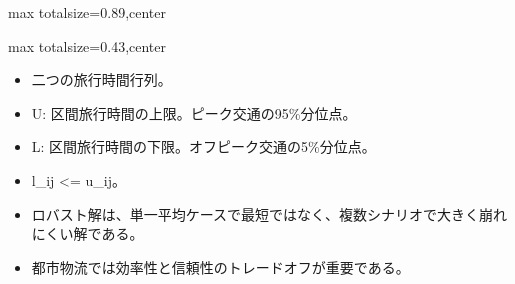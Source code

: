 \begin{minipage}[t]{0.58\textwidth}
\begin{adjustbox}{max totalsize={\textwidth}{0.89\textheight},center}
\begin{minipage}{\textwidth}
\end{minipage}
\end{adjustbox}
\end{minipage}


\clearpage
{}
\begin{minipage}[t]{0.405\textwidth}
\begin{adjustbox}{max totalsize={\textwidth}{0.43\textheight},center}
\begin{minipage}{\textwidth}\scriptsize
{}\begin{itemize}
\item 二つの旅行時間行列。
\item U: 区間旅行時間の上限。ピーク交通の95\%分位点。
\item L: 区間旅行時間の下限。オフピーク交通の5\%分位点。
\item l\_ij <= u\_ij。
\end{itemize}\begin{itemize}
\item ロバスト解は、単一平均ケースで最短ではなく、複数シナリオで大きく崩れにくい解である。
\item 都市物流では効率性と信頼性のトレードオフが重要である。
\end{itemize}
\end{minipage}
\end{adjustbox}
\end{minipage}\hfill
